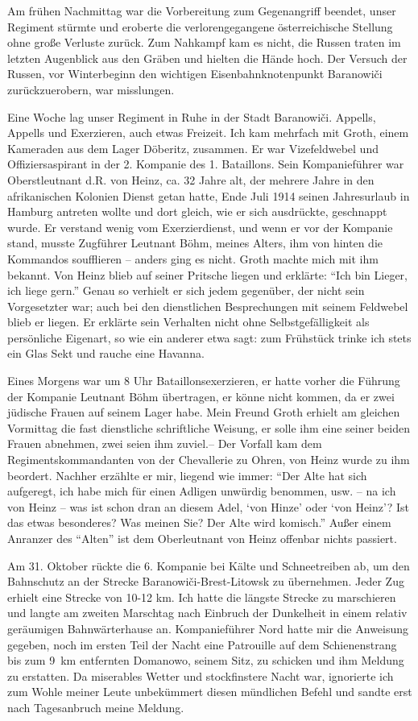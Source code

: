 \documentclass[a5paper,pagesize,10pt,twoside=true]{scrbook}
\begin{document}
Am frühen Nachmittag war die Vorbereitung zum Gegenangriff beendet, unser Regiment stürmte und eroberte die verlorengegangene österreichische Stellung ohne große Verluste zurück. Zum Nahkampf kam es nicht, die Russen traten im letzten Augenblick aus den Gräben und hielten die Hände hoch. Der Versuch der Russen, vor Winterbeginn den wichtigen Eisen\-bahn\-knoten\-punkt Baranowiči zurückzuerobern, war misslungen.

Eine Woche lag unser Regiment in Ruhe in der Stadt Baranowiči. Appells, Appells und Exerzieren, auch etwas Freizeit. Ich kam mehrfach mit Groth, einem Kameraden aus dem Lager Döberitz, zusammen. Er war Vizefeldwebel und Offiziersaspirant in der 2. Kompanie des 1. Bataillons. Sein Kompanieführer war Oberstleutnant d.R. von Heinz, ca. 32 Jahre alt, der mehrere Jahre in den afrikanischen Kolonien Dienst getan hatte, Ende Juli 1914 seinen Jahresurlaub in Hamburg antreten wollte und dort gleich, wie er sich ausdrückte, geschnappt wurde. Er verstand wenig vom Exerzierdienst, und wenn er vor der Kompanie stand, musste Zugführer Leutnant Böhm, meines Alters, ihm von hinten die Kommandos soufflieren -- anders ging es nicht. Groth machte mich mit ihm bekannt. Von Heinz blieb auf seiner Pritsche liegen und erklärte: \enquote{Ich bin Lieger, ich liege gern.} Genau so verhielt er sich jedem gegenüber, der nicht sein Vorgesetzter war; auch bei den dienstlichen Besprechungen mit seinem Feldwebel blieb er liegen. Er erklärte sein Verhalten nicht ohne Selbstgefälligkeit als persönliche Eigenart, so wie ein anderer etwa sagt: zum Frühstück trinke ich stets ein Glas Sekt und rauche eine Havanna.

Eines Morgens war um 8 Uhr Bataillonsexerzieren, er hatte vorher die Führung der Kompanie Leutnant Böhm übertragen, er könne nicht kommen, da er zwei jüdische Frauen auf seinem Lager habe. Mein Freund Groth erhielt am gleichen Vormittag die fast dienstliche schriftliche Weisung, er solle ihm eine seiner beiden Frauen abnehmen, zwei seien ihm zuviel.-- Der Vorfall kam dem Regimentskommandanten von der Chevallerie zu Ohren, von Heinz wurde zu ihm beordert. Nachher erzählte er mir, liegend wie immer: \enquote{Der Alte hat sich aufgeregt, ich habe mich für einen Adligen unwürdig benommen, usw. -- na ich von Heinz -- was ist schon dran an diesem Adel, \enquote{von Hinze} oder \enquote{von Heinz}? Ist das etwas besonderes? Was meinen Sie? Der Alte wird komisch.} Außer einem Anranzer des \enquote{Alten} ist dem Oberleutnant von Heinz offenbar nichts passiert.

Am 31. Oktober rückte die 6. Kompanie bei Kälte und Schneetreiben ab, um den Bahnschutz an der Strecke Baranowiči-Brest-Litowsk zu übernehmen. Jeder Zug erhielt eine Strecke von 10-12 km. Ich hatte die längste Strecke zu marschieren und langte am zweiten Marschtag nach Einbruch der Dunkelheit in einem relativ geräumigen Bahnwärterhause an. Kompanieführer Nord hatte mir die Anweisung gegeben, noch im ersten Teil der Nacht eine Patrouille auf dem Schienenstrang bis zum 9~km entfernten Domanowo, seinem Sitz, zu schicken und ihm Meldung zu erstatten. Da miserables Wetter und stockfinstere Nacht war, ignorierte ich zum Wohle meiner Leute unbekümmert diesen mündlichen Befehl und sandte erst nach Tagesanbruch meine Meldung.
\end{document}
